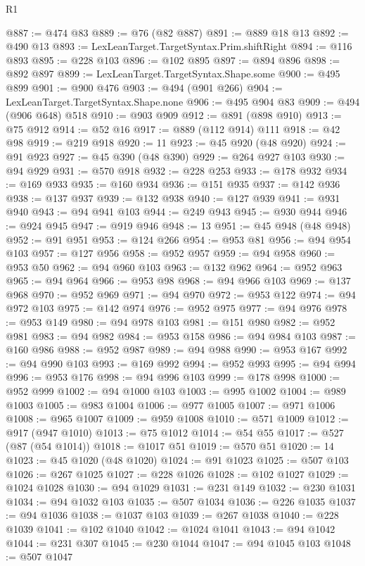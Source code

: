 \begin{lexlean}{R1}
\begin{coremodule}
@887 := @474 @83
@889 := @76 (@82 @887)
@891 := @889 @18 @13
@892 := @490 @13
@893 := LexLeanTarget.TargetSyntax.Prim.shiftRight
@894 := @116 @893
@895 := @228 @103
@896 := @102 @895
@897 := @894 @896
@898 := @892 @897
@899 := LexLeanTarget.TargetSyntax.Shape.some
@900 := @495 @899
@901 := @900 @476
@903 := @494 (@901 @266)
@904 := LexLeanTarget.TargetSyntax.Shape.none
@906 := @495 @904 @83
@909 := @494 (@906 @648) @518
@910 := @903 @909
@912 := @891 (@898 @910)
@913 := @75 @912
@914 := @52 @16
@917 := @889 (@112 @914) @111
@918 := @42 @98
@919 := @219 @918
@920 := 11
@923 := @45 @920 (@48 @920)
@924 := @91 @923
@927 := @45 @390 (@48 @390)
@929 := @264 @927 @103
@930 := @94 @929
@931 := @570 @918
@932 := @228 @253
@933 := @178 @932
@934 := @169 @933
@935 := @160 @934
@936 := @151 @935
@937 := @142 @936
@938 := @137 @937
@939 := @132 @938
@940 := @127 @939
@941 := @931 @940
@943 := @94 @941 @103
@944 := @249 @943
@945 := @930 @944
@946 := @924 @945
@947 := @919 @946
@948 := 13
@951 := @45 @948 (@48 @948)
@952 := @91 @951
@953 := @124 @266
@954 := @953 @81
@956 := @94 @954 @103
@957 := @127 @956
@958 := @952 @957
@959 := @94 @958
@960 := @953 @50
@962 := @94 @960 @103
@963 := @132 @962
@964 := @952 @963
@965 := @94 @964
@966 := @953 @98
@968 := @94 @966 @103
@969 := @137 @968
@970 := @952 @969
@971 := @94 @970
@972 := @953 @122
@974 := @94 @972 @103
@975 := @142 @974
@976 := @952 @975
@977 := @94 @976
@978 := @953 @149
@980 := @94 @978 @103
@981 := @151 @980
@982 := @952 @981
@983 := @94 @982
@984 := @953 @158
@986 := @94 @984 @103
@987 := @160 @986
@988 := @952 @987
@989 := @94 @988
@990 := @953 @167
@992 := @94 @990 @103
@993 := @169 @992
@994 := @952 @993
@995 := @94 @994
@996 := @953 @176
@998 := @94 @996 @103
@999 := @178 @998
@1000 := @952 @999
@1002 := @94 @1000 @103
@1003 := @995 @1002
@1004 := @989 @1003
@1005 := @983 @1004
@1006 := @977 @1005
@1007 := @971 @1006
@1008 := @965 @1007
@1009 := @959 @1008
@1010 := @571 @1009
@1012 := @917 (@947 @1010)
@1013 := @75 @1012
@1014 := @54 @55
@1017 := @527 (@87 (@54 @1014))
@1018 := @1017 @51
@1019 := @570 @51
@1020 := 14
@1023 := @45 @1020 (@48 @1020)
@1024 := @91 @1023
@1025 := @507 @103
@1026 := @267 @1025
@1027 := @228 @1026
@1028 := @102 @1027
@1029 := @1024 @1028
@1030 := @94 @1029
@1031 := @231 @149
@1032 := @230 @1031
@1034 := @94 @1032 @103
@1035 := @507 @1034
@1036 := @226 @1035
@1037 := @94 @1036
@1038 := @1037 @103
@1039 := @267 @1038
@1040 := @228 @1039
@1041 := @102 @1040
@1042 := @1024 @1041
@1043 := @94 @1042
@1044 := @231 @307
@1045 := @230 @1044
@1047 := @94 @1045 @103
@1048 := @507 @1047

\end{coremodule}
\end{lexlean}
